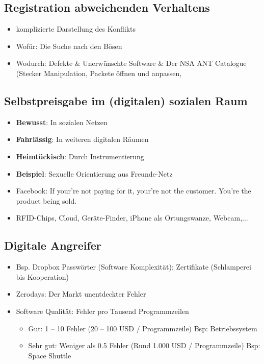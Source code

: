 \documentclass{article} %
\begin{document}
		\subsection{Registration abweichenden Verhaltens}
	\begin{itemize}
		\item komplizierte Darstellung des Konflikts
		\item Wofür: Die Suche nach den Bösen
		\item Wodurch: Defekte \& Unerwünschte Software \& Der NSA ANT Catalogue\\
		(Stecker Manipulation, Packete öffnen und anpassen,
	\end{itemize} 
		\subsection{Selbstpreisgabe im (digitalen) sozialen Raum}	
	\begin{itemize}			\item \textbf{Bewusst}: In sozialen Netzen
		\item \textbf{Fahrlässig}: In weiteren digitalen Räumen
		\item \textbf{Heimtückisch}: Durch Instrumentierung
		\item \textbf{Beispiel}: Sexuelle Orientierung aus Freunde-Netz
		\item Facebook: \glqq If your're not paying for it, your're not the customer. You're the product being sold.\grqq
		\item RFID-Chips, Cloud, Geräte-Finder, iPhone als Ortungswanze, Webcam,...
			
	\end{itemize}
		\subsection{Digitale Angreifer}
	\begin{itemize}
			\item Bsp. Dropbox Passwörter (Software Komplexität); Zertifikate (Schlamperei bis Kooperation)
			\item Zerodays: Der Markt unentdeckter Fehler
			\item Software Qualität: Fehler pro Tausend Programmzeilen
			\begin{itemize}
				\item Gut: 1 – 10 Fehler (20 – 100 USD / Programmzeile) Bsp: Betriebssystem
				\item Sehr gut: Weniger als 0.5 Fehler (Rund 1.000 USD / Programmzeile) Bsp: Space Shuttle				
			\end{itemize}
	\end{itemize}
\end{document}
